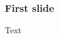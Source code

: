 \newcommand{\figwidth}{0.43\linewidth}


\begin{frame}
\frametitle{First slide}


Text

\end{frame}
